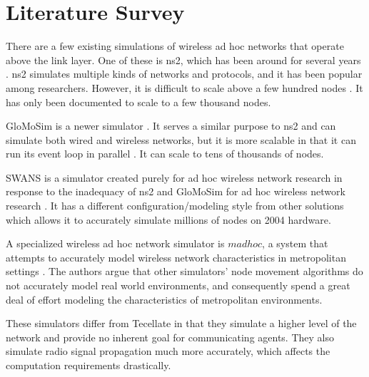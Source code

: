 \section{Literature Survey}

There are a few existing simulations of wireless ad hoc networks that operate above the link layer. One of these is ns2, which has been around for several years \cite{ns2}. ns2 simulates multiple kinds of networks and protocols, and it has been popular among researchers. However, it is difficult to scale above a few hundred nodes \cite{swans}. It has only been documented to scale to a few thousand nodes.

GloMoSim is a newer simulator \cite{glomosim}. It serves a similar purpose to ns2 and can simulate both wired and wireless networks, but it is more scalable in that it can run its event loop in parallel \cite{swans}. It can scale to tens of thousands of nodes.

SWANS is a simulator created purely for ad hoc wireless network research in response to the inadequacy of ns2 and GloMoSim for ad hoc wireless network research \cite{swans}. It has a different configuration/modeling style from other solutions which allows it to accurately simulate millions of nodes on 2004 hardware.

A specialized wireless ad hoc network simulator is $madhoc$, a system that attempts to accurately model wireless network characteristics in metropolitan settings \cite{madhoc}. The authors argue that other simulators' node movement algorithms do not accurately model real world environments, and consequently spend a great deal of effort modeling the characteristics of metropolitan environments.

These simulators differ from Tecellate in that they simulate a higher level of the network and provide no inherent goal for communicating agents. They also simulate radio signal propagation much more accurately, which affects the computation requirements drastically.

